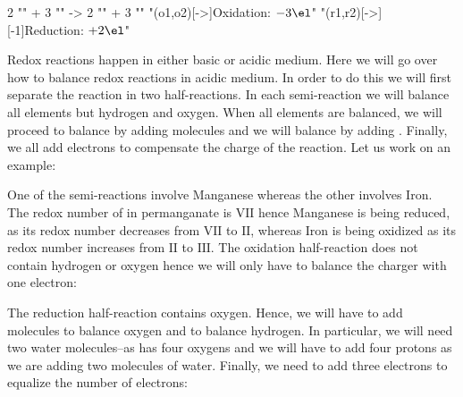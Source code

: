 \documentclass[main.tex]{subfiles}
\begin{document}
\begin{description}
\vspace{0.5cm}
 \begin{reaction*}
   2 "" \sld{} + 3 "" \aq{} 
    ->
  2 "" \aq{} + 3 "" \sld{}
  "\redox(o1,o2)[->]{\small Oxidation: $- 3\el$}"
  "\redox(r1,r2)[->][-1]{\small Reduction: $+ 2\el$}"
\end{reaction*}
\vspace{0.5cm}
 \item[\docfilehook{Balancing redox reactions in acidic medium}{}] Redox reactions happen in either basic or acidic medium. Here we will go over how to balance redox reactions in acidic medium. In order to do this we will first separate the reaction in two half-reactions. In each semi-reaction we will balance all elements but hydrogen and oxygen. When all elements are balanced, we will proceed to balance  by adding  molecules and we will balance  by adding . Finally, we all add electrons to compensate the charge of the reaction. Let us work on an example:
\begin{center}\end{center}
One of the semi-reactions involve Manganese whereas the other involves Iron. The redox number of  in permanganate is $\text{VII}$ hence Manganese is being reduced, as its redox number decreases from $\text{VII}$ to $\text{II}$, whereas Iron is being oxidized as its redox number increases from $\text{II}$ to $\text{III}$. The oxidation half-reaction does not contain hydrogen or oxygen hence we will only have to balance the charger with one electron:
\begin{center}\end{center}
The reduction half-reaction contains oxygen. Hence, we will have to add  molecules to balance oxygen and  to balance hydrogen. In particular, we will need two water molecules--as  has four oxygens and we will have to add four protons as we are adding two molecules of water. Finally, we need to add three electrons to equalize the number of electrons:


\end{description}
\end{document}
